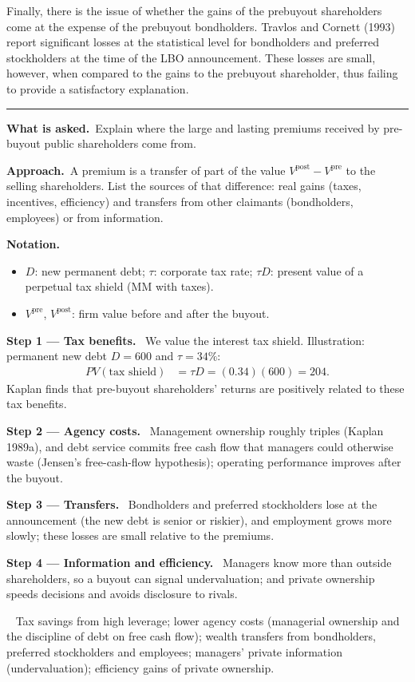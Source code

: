 \documentclass[11pt,a4paper]{article}
\newcommand{\notation}{\par\noindent\textbf{Notation.}}
\newcommand{\step}[2]{\par\medskip\noindent\textbf{Step #1 --- #2.}~}
\newcommand{\asked}{\par\medskip\noindent\textbf{What is asked.}~}
\newcommand{\approach}{\par\smallskip\noindent\textbf{Approach.}~}
\newcommand{\answer}[1]{\par\smallskip\noindent\fbox{\textbf{Answer #1.}}~}
\newcommand{\stmtend}{\par\endgroup\nopagebreak\noindent\rule{\linewidth}{0.4pt}\par\medskip}
\begin{document}
Finally, there is the issue of whether the gains of the prebuyout shareholders come at the expense
of the prebuyout bondholders. Travlos and Cornett (1993) report significant losses at the
statistical level for bondholders and preferred stockholders at the time of the LBO announcement.
These losses are small, however, when compared to the gains to the prebuyout shareholder, thus
failing to provide a satisfactory explanation.
\stmtend

\asked Explain where the large and lasting premiums received by pre-buyout public shareholders come from.

\approach A premium is a transfer of part of the value $V^{\text{post}}-V^{\text{pre}}$ to the selling
shareholders. List the sources of that difference: real gains (taxes, incentives, efficiency) and
transfers from other claimants (bondholders, employees) or from information.

\notation
\begin{itemize}
  \item $D$: new permanent debt; $\tau$: corporate tax rate; $\tau D$: present value of a perpetual tax shield (MM with taxes).
  \item $V^{\text{pre}}$, $V^{\text{post}}$: firm value before and after the buyout.
\end{itemize}

\step{1}{Tax benefits} We value the interest tax shield. Illustration: permanent new debt $D=600$ and
$\tau=34\%$:
\begin{align}
  PV(\text{tax shield}) &= \tau D = (0.34)(600)=204. \label{r9e4-ts}
\end{align}
Kaplan finds that pre-buyout shareholders' returns are positively related to these tax benefits.

\step{2}{Agency costs} Management ownership roughly triples (Kaplan 1989a), and debt service commits free
cash flow that managers could otherwise waste (Jensen's free-cash-flow hypothesis); operating
performance improves after the buyout.

\step{3}{Transfers} Bondholders and preferred stockholders lose at the announcement (the new debt is
senior or riskier), and employment grows more slowly; these losses are small relative to the premiums.

\step{4}{Information and efficiency} Managers know more than outside shareholders, so a buyout can
signal undervaluation; and private ownership speeds decisions and avoids disclosure to rivals.
\answer{(\#3)} Tax savings from high leverage; lower agency costs (managerial ownership and the
discipline of debt on free cash flow); wealth transfers from bondholders, preferred stockholders and
employees; managers' private information (undervaluation); efficiency gains of private ownership.
\end{document}
